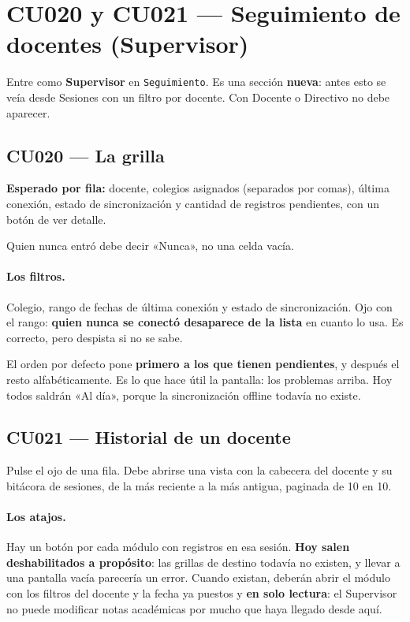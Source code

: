 \documentclass[11pt,a4paper]{article}
\newcommand{\ruta}[1]{\textcolor{azulmarino}{\texttt{#1}}}
\begin{document}
\section{CU020 y CU021 --- Seguimiento de docentes (Supervisor)}

Entre como \textbf{Supervisor} en \ruta{Seguimiento}. Es una sección
\textbf{nueva}: antes esto se veía desde Sesiones con un filtro por docente.
Con Docente o Directivo no debe aparecer.

\subsection{CU020 --- La grilla}

\textbf{Esperado por fila:} docente, colegios asignados (separados por comas),
última conexión, estado de sincronización y cantidad de registros pendientes,
con un botón de ver detalle.

Quien nunca entró debe decir «Nunca», no una celda vacía.

\paragraph{Los filtros.} Colegio, rango de fechas de última conexión y estado
de sincronización. Ojo con el rango: \textbf{quien nunca se conectó desaparece
de la lista} en cuanto lo usa. Es correcto, pero despista si no se sabe.

El orden por defecto pone \textbf{primero a los que tienen pendientes}, y
después el resto alfabéticamente. Es lo que hace útil la pantalla: los problemas
arriba. Hoy todos saldrán «Al día», porque la sincronización offline todavía no
existe.

\subsection{CU021 --- Historial de un docente}

Pulse el ojo de una fila. Debe abrirse una vista con la cabecera del docente y
su bitácora de sesiones, de la más reciente a la más antigua, paginada de 10 en
10.

\paragraph{Los atajos.} Hay un botón por cada módulo con registros en esa
sesión. \textbf{Hoy salen deshabilitados a propósito}: las grillas de destino
todavía no existen, y llevar a una pantalla vacía parecería un error. Cuando
existan, deberán abrir el módulo con los filtros del docente y la fecha ya
puestos y \textbf{en solo lectura}: el Supervisor no puede modificar notas
académicas por mucho que haya llegado desde aquí.
\end{document}
